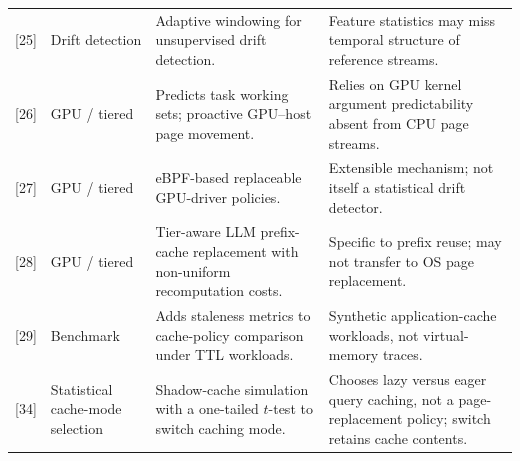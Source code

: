 \documentclass[journal,onecolumn]{IEEEtran}
\begin{document}
\begin{table}[!t]
\begin{tabular}{@{}p{}p{}p{}p{}@{}}
{[25]} & Drift detection & Adaptive windowing for unsupervised drift detection. & Feature statistics may miss temporal structure of reference streams. \\
{[26]} & GPU / tiered & Predicts task working sets; proactive GPU--host page movement. & Relies on GPU kernel argument predictability absent from CPU page streams. \\
{[27]} & GPU / tiered & eBPF-based replaceable GPU-driver policies. & Extensible mechanism; not itself a statistical drift detector. \\
{[28]} & GPU / tiered & Tier-aware LLM prefix-cache replacement with non-uniform recomputation costs. & Specific to prefix reuse; may not transfer to OS page replacement. \\
{[29]} & Benchmark & Adds staleness metrics to cache-policy comparison under TTL workloads. & Synthetic application-cache workloads, not virtual-memory traces. \\
{[34]} & Statistical cache-mode selection & Shadow-cache simulation with a one-tailed $t$-test to switch caching mode. & Chooses lazy versus eager query caching, not a page-replacement policy; switch retains cache contents. \\
\bottomrule
\end{tabular}
\end{table}
\end{document}
